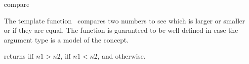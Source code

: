 \begin{ccRefFunction}{compare}

\ccDefinition

The template function \ccRefName\ compares two numbers to see which is larger or
smaller or if they are equal. The function is guaranteed to be well defined in case the argument type 
is a model of the  concept. 


{returns  iff $n1>n2$,  iff $n1<n2$, and 
otherwise.}

\\
\\

\end{ccRefFunction}
